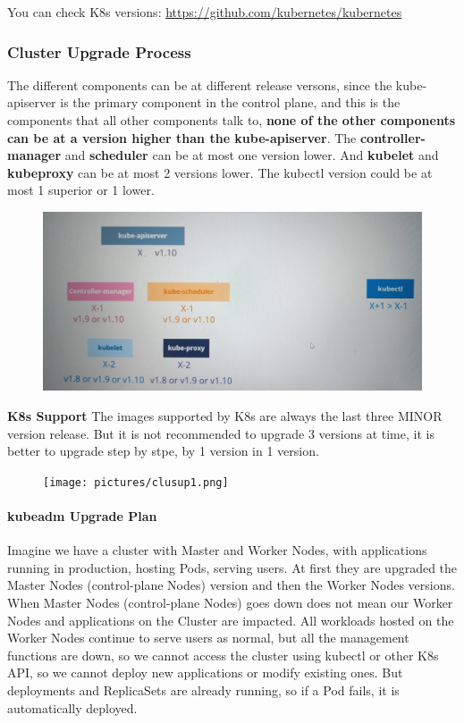 \documentclass{article}
\begin{document}
You can check K8s versions: \href{https://github.com/kubernetes/kubernetes}{https://github.com/kubernetes/kubernetes}

\subsubsection{Cluster Upgrade Process}

The different components can be at different release versons, 
since the kube-apiserver is the primary component in the control plane, 
and this is the components that all other components talk to, \textbf{none of the other components can be at a version higher than the kube-apiserver}. The \textbf{controller-manager} and \textbf{scheduler} can be at most one version lower. And \textbf{kubelet} and \textbf{kubeproxy} can be at most 2 versions lower. The kubectl version could be at most 1 superior or 1 lower.

\begin{figure}[H]
    \includegraphics[scale=0.5]{pictures/clusup.png}
\end{figure}

\textbf{K8s Support}
The images supported by K8s are always the last three MINOR version release. But it is not recommended to upgrade 3 versions at time, it is better to upgrade step by stpe, by 1 version in 1 version.

\begin{figure}[H]
    \texttt{[image: pictures/clusup1.png]}
\end{figure}

\paragraph{kubeadm Upgrade Plan}

Imagine we have a cluster with Master and Worker Nodes, with applications running in production, hosting Pods, serving users. At first they are upgraded the Master Nodes (control-plane Nodes) version and then the Worker Nodes versions. When Master Nodes (control-plane Nodes) goes down does not mean our Worker Nodes and applications on the Cluster are impacted. All workloads hosted on the Worker Nodes continue to serve users as normal, but all the management functions are down, so we cannot access the cluster using kubectl or other K8s API, so we cannot deploy new applications or modify existing ones.  But deployments and ReplicaSets are already running, so if a Pod fails, it is automatically deployed.
\end{document}

